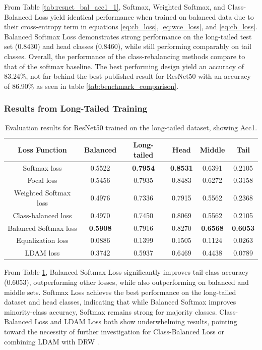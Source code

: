 From Table \ref{tab:resnet_bal_acc1_1}, Softmax, Weighted Softmax, and Class-Balanced Loss yield identical performance when trained on balanced data due to their cross-entropy term in equations \eqref{eq:cb_loss}, \eqref{eq:wce_loss}, and \eqref{eq:cb_loss}. Balanced Softmax Loss demonstrates strong performance on the long-tailed test set (0.8430) and head classes (0.8460), while still performing comparably on tail classes. Overall, the performance of the class-rebalancing methods compare to that of the softmax baseline. The best performing design yield an accuracy of 83.24\%, not far behind the best published result for ResNet50 with an accuracy of 86.90\% as seen in table \ref{tab:benchmark_comparison}.

\subsubsection{Results from Long-Tailed Training}

\begin{table}[H]
    \centering
    \caption{Evaluation results for ResNet50 trained on the long-tailed dataset, showing Acc1.}
    \begin{tabular}{cccccc}
        \toprule
        Loss Function & Balanced & Long-tailed & Head & Middle & Tail \\ 
        \midrule
        Softmax loss   & 0.5522 & \textbf{0.7954} & \textbf{0.8531} & 0.6391 & 0.2105 \\
        Focal loss   & 0.5456 & 0.7935 & 0.8483 & 0.6272 & 0.3158 \\
        Weighted Softmax loss   & 0.4976 & 0.7336 & 0.7915 & 0.5562 & 0.2368 \\
        Class-balanced loss   & 0.4970 & 0.7450 & 0.8069 & 0.5562 & 0.2105 \\
        Balanced Softmax loss   & \textbf{0.5908} & 0.7916 & 0.8270 & \textbf{0.6568} & \textbf{0.6053} \\
        Equalization loss   & 0.0886 & 0.1399 & 0.1505 & 0.1124 &  0.0263 \\
        LDAM loss   & 0.3742 & 0.5937 & 0.6469 & 0.4438 & 0.0789 \\
        \bottomrule
    \end{tabular}
    \label{tab:resnet_lt_acc1_1}
\end{table}

From Table \ref{tab:resnet_lt_acc1_1}, Balanced Softmax Loss significantly improves tail-class accuracy (0.6053), outperforming other losses, while also outperforming on balanced and middle sets. Softmax Loss achieves the best performance on the long-tailed dataset and head classes, indicating that while Balanced Softmax improves minority-class accuracy, Softmax remains strong for majority classes. Class-Balanced Loss and LDAM Loss both show underwhelming results, pointing toward the necessity of further investigation for Class-Balanced Loss  or combining LDAM with DRW \cite{cao2019learningimbalanceddatasetslabeldistributionaware}. 


